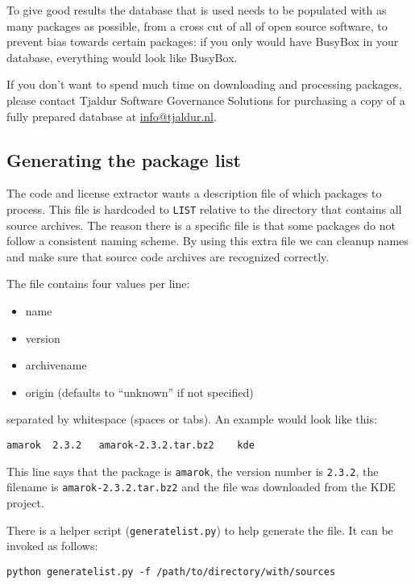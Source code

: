 \documentclass[10pt]{article}
\begin{document}
To give good results the database that is used needs to be populated with as
many packages as possible, from a cross cut of all of open source software, to
prevent bias towards certain packages: if you only would have BusyBox in your
database, everything would look like BusyBox.

If you don't want to spend much time on downloading and processing
packages, please contact Tjaldur Software Governance Solutions for
purchasing a copy of a fully prepared database at \url{info@tjaldur.nl}.

\subsection{Generating the package list}

The code and license extractor wants a description file of which packages to
process. This file is hardcoded to \texttt{LIST} relative to the directory that
contains all source archives. The reason there is a specific file is that some
packages do not follow a consistent naming scheme. By using this extra file we
can cleanup names and make sure that source code archives are recognized
correctly.

The file contains four values per line:

\begin{itemize}
\item name
\item version
\item archivename
\item origin (defaults to ``unknown'' if not specified)
\end{itemize}

separated by whitespace (spaces or tabs). An example would look like this:

\begin{verbatim}
amarok	2.3.2	amarok-2.3.2.tar.bz2	kde
\end{verbatim}

This line says that the package is \texttt{amarok}, the version number is
\texttt{2.3.2}, the filename is \texttt{amarok-2.3.2.tar.bz2} and the file
was downloaded from the KDE project.

There is a helper script (\texttt{generatelist.py}) to help generate the file.
It can be invoked as follows:

\begin{verbatim}
python generatelist.py -f /path/to/directory/with/sources
\end{verbatim}
\end{document}

